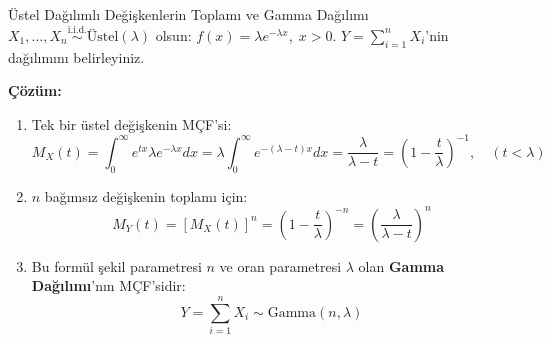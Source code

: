 \documentclass[12pt,a4paper]{article}
\begin{document}
\begin{ornek}{Üstel Dağılımlı Değişkenlerin Toplamı ve Gamma Dağılımı}
$X_1, \dots, X_n \overset{\text{i.i.d.}}{\sim} \text{Üstel}(\lambda)$ olsun: $f(x) = \lambda e^{-\lambda x}, \; x > 0$. $Y = \sum_{i=1}^n X_i$'nin dağılımını belirleyiniz.

\bigskip
\textbf{Çözüm:}
\begin{enumerate}
    \item Tek bir üstel değişkenin MÇF'si:
    \begin{equation}
        M_X(t) = \int_0^\infty e^{tx} \lambda e^{-\lambda x} dx = \lambda \int_0^\infty e^{-(\lambda - t)x} dx = \frac{\lambda}{\lambda - t} = \left( 1 - \frac{t}{\lambda} \right)^{-1}, \quad (t < \lambda)
    \end{equation}
    \item $n$ bağımsız değişkenin toplamı için:
    \begin{equation}
        M_Y(t) = [M_X(t)]^n = \left( 1 - \frac{t}{\lambda} \right)^{-n} = \left( \frac{\lambda}{\lambda - t} \right)^n
    \end{equation}
    \item Bu formül şekil parametresi $n$ ve oran parametresi $\lambda$ olan \textbf{Gamma Dağılımı}'nın MÇF'sidir:
    \begin{equation}
        \boxed{Y = \sum_{i=1}^n X_i \sim \text{Gamma}(n, \lambda)}
    \end{equation}
\end{enumerate}
\end{ornek}

\begin{center}
\end{center}
\end{document}
